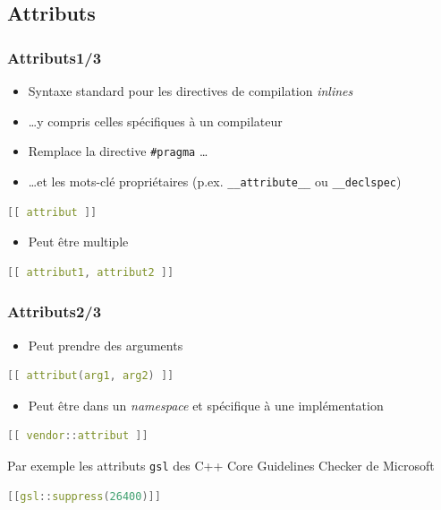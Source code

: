 \documentclass[C++.tex]{subfiles}
\begin{document}
\subsection*{Attributs}
\begin{frame}[fragile]
	\frametitle{Attributs\titlehfill{}1/3}
	\begin{itemize}
		\item Syntaxe standard pour les directives de compilation \textit{inlines}
		\item \ldots y compris celles spécifiques à un compilateur
		\item Remplace la directive \lstinline|#pragma| \ldots
		\item \ldots{}et les mots-clé propriétaires (p.ex. \lstinline|__attribute__| ou \lstinline|__declspec|)
	\end{itemize}

	\begin{lstlisting}[language=C++]
[[ attribut ]]\end{lstlisting}


	\begin{itemize}
		\item Peut être multiple
	\end{itemize}

	\begin{lstlisting}[language=C++]
[[ attribut1, attribut2 ]]\end{lstlisting}
\end{frame}

\begin{frame}[fragile]
	\frametitle{Attributs\titlehfill{}2/3}
	\begin{itemize}
		\item Peut prendre des arguments
	\end{itemize}

	\begin{lstlisting}[language=C++]
[[ attribut(arg1, arg2) ]]\end{lstlisting}

	\begin{itemize}
		\item Peut être dans un \textit{namespace} et spécifique à une implémentation
	\end{itemize}

	\begin{lstlisting}[language=C++]
[[ vendor::attribut ]]\end{lstlisting}

	\begin{block}{Par exemple}
		les attributs \lstinline|gsl| des \og C++ Core Guidelines Checker\fg{} de Microsoft
		
	\begin{lstlisting}[language=C++]
[[gsl::suppress(26400)]]\end{lstlisting}
	\end{block}
\end{frame}
\end{document}
